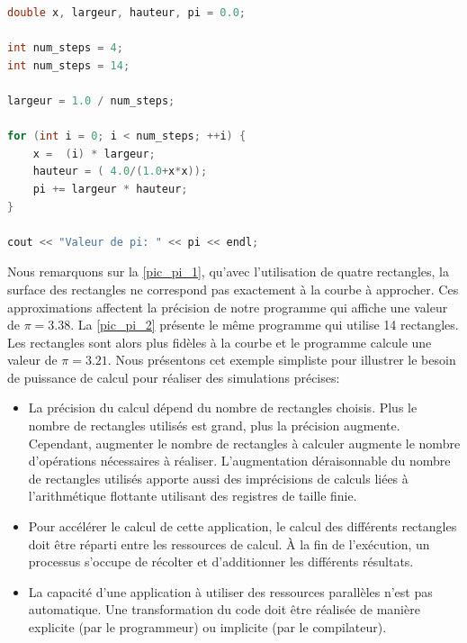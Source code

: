         \begin{lstlisting}[language=C, caption=Implémentation de l'algorithme de calcul d'intégrale par la méthode des rectangles, float,floatplacement=H, label=lst:pipi]
double x, largeur, hauteur, pi = 0.0;

int num_steps = 4;
int num_steps = 14;

largeur = 1.0 / num_steps;

for (int i = 0; i < num_steps; ++i) {
    x =  (i) * largeur;
    hauteur = ( 4.0/(1.0+x*x));
    pi += largeur * hauteur;
}

cout << "Valeur de pi: " << pi << endl;
\end{lstlisting}
    
         Nous remarquons sur la \autoref{pic_pi_1}, qu'avec l'utilisation de quatre rectangles, la surface des rectangles ne correspond pas exactement à la courbe à approcher. Ces approximations affectent la précision de notre programme qui affiche une valeur de $\pi = 3.38$. La \autoref{pic_pi_2} présente le même programme qui utilise 14 rectangles. Les rectangles sont alors plus fidèles à la courbe et le programme calcule une valeur de $\pi = 3.21$.
        Nous présentons cet exemple simpliste pour illustrer le besoin de puissance de calcul pour réaliser des simulations précises:
        \begin{itemize}
            \item La précision du calcul dépend du nombre de rectangles choisis. Plus le nombre de rectangles utilisés est grand, plus la précision augmente. Cependant, augmenter le nombre de rectangles à calculer augmente le nombre d'opérations nécessaires à réaliser. L'augmentation déraisonnable du nombre de rectangles utilisés apporte aussi des imprécisions de calculs liées à l'arithmétique flottante utilisant des registres de taille finie.
            
            \item Pour accélérer le calcul de cette application, le calcul des différents rectangles doit être réparti entre les ressources de calcul. À la fin de l'exécution, un processus s'occupe de récolter et d'additionner les différents résultats.
            
            \item La capacité d'une application à utiliser des ressources parallèles n'est pas automatique. Une transformation du code doit être réalisée de manière explicite (par le programmeur) ou implicite (par le compilateur).
        \end{itemize}
        
